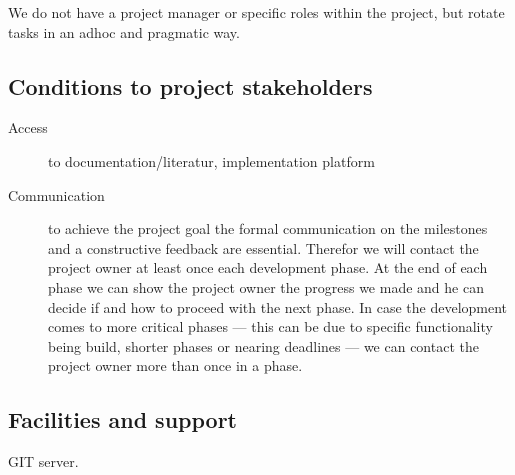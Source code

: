 \documentclass{article}
\begin{document}
We do not have a project manager or specific roles within the project, but 
rotate tasks in an adhoc and pragmatic way. 

\subsection{Conditions to project stakeholders} 

\begin{description}
\item[Access]
to documentation/literatur, implementation platform 
\item[Communication]
to achieve the project goal the formal communication on the milestones and a 
constructive feedback are essential. Therefor we will contact the project owner 
at least once each development phase. At the end of each phase we can show the 
project owner the progress we made and he can decide if and how to proceed with 
the next phase. In case the development comes to more critical phases --- this 
can be due to specific functionality being build, shorter phases or nearing 
deadlines --- we can contact the project owner more than once in a phase. 
\end{description}

\subsection{Facilities and support}

GIT server.
\end{document}
